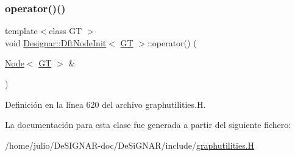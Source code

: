 \subsubsection{\texorpdfstring{operator()()}{operator()()}}
{\footnotesize\ttfamily template$<$class GT $>$ \\
void \hyperlink{class_designar_1_1_dft_node_init}{Designar\+::\+Dft\+Node\+Init}$<$ \hyperlink{demo-buildgraph_8_c_a3001c40d2c31ca87ed96cd7d1334a55e}{GT} $>$\+::operator() (\begin{DoxyParamCaption}\item[{\hyperlink{namespace_designar_a5af326c65aa2bd26b26c410f2030d09e}{Node}$<$ \hyperlink{demo-buildgraph_8_c_a3001c40d2c31ca87ed96cd7d1334a55e}{GT} $>$ \&}]{ }\end{DoxyParamCaption})\hspace{0.3cm}{\ttfamily [inline]}}



Definición en la línea 620 del archivo graphutilities.\+H.



La documentación para esta clase fue generada a partir del siguiente fichero\+:\begin{DoxyCompactItemize}
\item 
/home/julio/\+De\+S\+I\+G\+N\+A\+R-\/doc/\+De\+Si\+G\+N\+A\+R/include/\hyperlink{graphutilities_8_h}{graphutilities.\+H}\end{DoxyCompactItemize}
